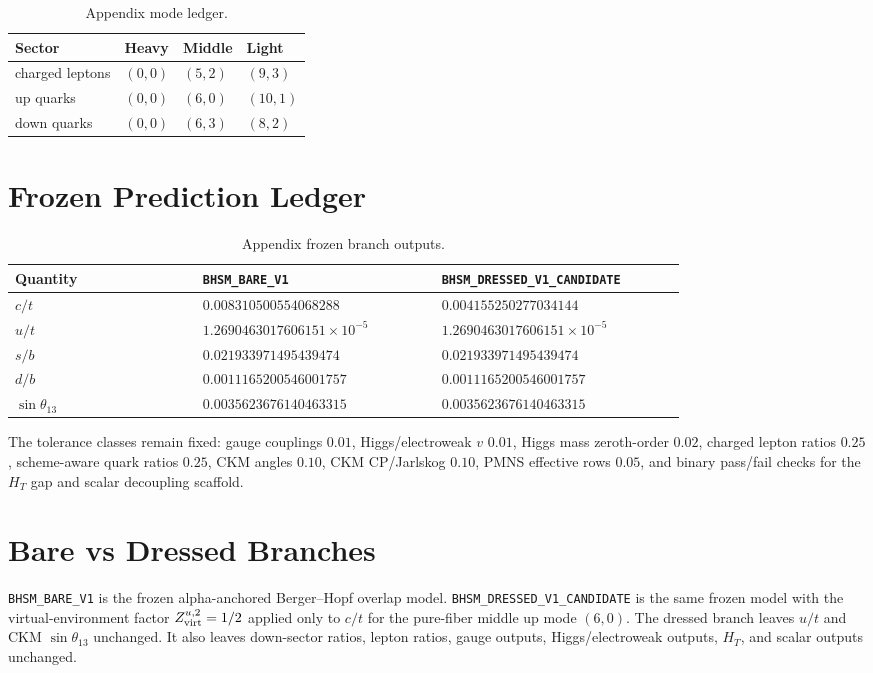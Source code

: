\documentclass[11pt]{article}
\newcommand{\Bare}{\texttt{BHSM\_BARE\_V1}}
\newcommand{\Dressed}{\texttt{BHSM\_DRESSED\_V1}\allowbreak\texttt{\_CANDIDATE}}
\newcommand{\HT}{\ensuremath{H_T}}
\begin{document}
\begin{table}[htbp]
\centering
\caption{Appendix mode ledger.}
\small
\begin{tabular}{@{}llll@{}}
\toprule
Sector & Heavy & Middle & Light \\
\midrule
charged leptons & $(0,0)$ & $(5,2)$ & $(9,3)$ \\
up quarks & $(0,0)$ & $(6,0)$ & $(10,1)$ \\
down quarks & $(0,0)$ & $(6,3)$ & $(8,2)$ \\
\bottomrule
\end{tabular}
\end{table}

\section{Frozen Prediction Ledger}

\begin{table}[htbp]
\centering
\caption{Appendix frozen branch outputs.}
\small
\begin{tabular}{@{}L{0.22\linewidth}L{0.28\linewidth}L{0.28\linewidth}@{}}
\toprule
Quantity & \Bare{} & \Dressed{} \\
\midrule
$c/t$ & $0.008310500554068288$ & $0.004155250277034144$ \\
$u/t$ & $1.2690463017606151\times10^{-5}$ & $1.2690463017606151\times10^{-5}$ \\
$s/b$ & $0.021933971495439474$ & $0.021933971495439474$ \\
$d/b$ & $0.0011165200546001757$ & $0.0011165200546001757$ \\
$\sin\theta_{13}$ & $0.0035623676140463315$ & $0.0035623676140463315$ \\
\bottomrule
\end{tabular}
\end{table}

The tolerance classes remain fixed: gauge couplings $0.01$, Higgs/electroweak
$v$ $0.01$, Higgs mass zeroth-order $0.02$, charged lepton ratios $0.25$,
scheme-aware quark ratios $0.25$, CKM angles $0.10$, CKM CP/Jarlskog $0.10$,
PMNS effective rows $0.05$, and binary pass/fail checks for the \HT{} gap and
scalar decoupling scaffold.

\section{Bare vs Dressed Branches}

\Bare{} is the frozen alpha-anchored Berger--Hopf overlap model. \Dressed{} is
the same frozen model with the virtual-environment factor
$Z_{\rm virt}^{u,2}=1/2$ applied only to $c/t$ for the pure-fiber middle up
mode $(6,0)$. The dressed branch leaves $u/t$ and CKM $\sin\theta_{13}$
unchanged. It also leaves down-sector ratios, lepton ratios, gauge outputs,
Higgs/electroweak outputs, \HT{}, and scalar outputs unchanged.
\end{document}
